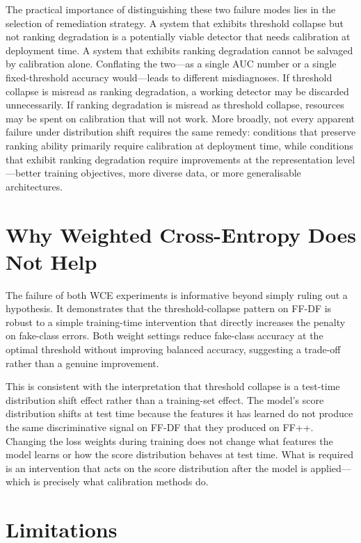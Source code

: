 \documentclass[a4paper,12pt]{report}
\begin{document}
The practical importance of distinguishing these two
failure modes lies in the selection of remediation
strategy.
A system that exhibits threshold collapse but not
ranking degradation is a potentially viable detector
that needs calibration at deployment time.
A system that exhibits ranking degradation cannot be
salvaged by calibration alone.
Conflating the two---as a single AUC number or a single
fixed-threshold accuracy would---leads to different
misdiagnoses.
If threshold collapse is misread as ranking degradation,
a working detector may be discarded unnecessarily.
If ranking degradation is misread as threshold collapse,
resources may be spent on calibration that will not work.
More broadly, not every apparent failure under distribution
shift requires the same remedy: conditions that preserve
ranking ability primarily require calibration at
deployment time, while conditions that exhibit ranking
degradation require improvements at the representation
level---better training objectives, more diverse data, or
more generalisable architectures.

\section{Why Weighted Cross-Entropy Does Not Help}

The failure of both WCE experiments is informative beyond
simply ruling out a hypothesis.
It demonstrates that the threshold-collapse pattern on
FF-DF is robust to a simple training-time intervention
that directly increases the penalty on fake-class errors.
Both weight settings reduce fake-class accuracy at the
optimal threshold without improving balanced accuracy,
suggesting a trade-off rather than a genuine improvement.

This is consistent with the interpretation that threshold
collapse is a test-time distribution shift effect rather
than a training-set effect.
The model's score distribution shifts at test time because
the features it has learned do not produce the same
discriminative signal on FF-DF that they produced on FF++.
Changing the loss weights during training does not change
what features the model learns or how the score
distribution behaves at test time.
What is required is an intervention that acts on the
score distribution after the model is applied---which
is precisely what calibration methods do.

\section{Limitations}
\label{sec:limitations}
\end{document}
